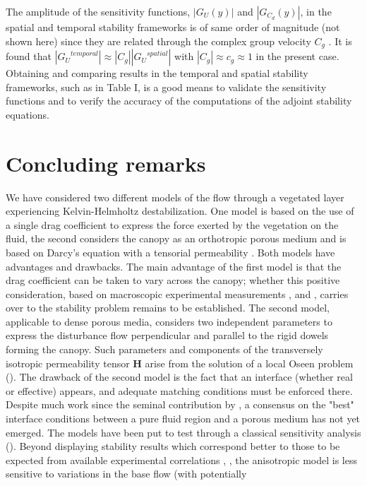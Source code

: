 The amplitude of the sensitivity functions, $|G_{U} ( y)|$ and $|G_{C_d} (y)|$, in the spatial and temporal
stability frameworks is of same order of magnitude (not shown here) since they are related through
 the complex group velocity $C_g$ . It is found that $|{G_U}^{temporal}| \approx |C_g ||{G_U}^{spatial}|$ with $|C_g | \approx c_g \approx 1$ in the
present case.
Obtaining and comparing results in the temporal and spatial stability frameworks, such as in
Table I, is a good means to validate the sensitivity functions and to verify the accuracy of the
computations of the adjoint stability equations.


\section{Concluding remarks}
We have considered two different models of the flow through a vegetated layer experiencing Kelvin-Helmholtz destabilization. One model is based on the use of a single drag coefficient to express the force exerted by the vegetation on the fluid, the second considers the canopy as an orthotropic porous medium and is based on Darcy’s equation with a tensorial permeability \citet{zampogna2016fluid}. 
Both models have advantages and drawbacks. The main advantage of the first model is that the
drag coefficient can be taken to vary across the canopy; whether this positive consideration, based
on macroscopic experimental measurements \citet{ghisalberti2002mixing}, \citet{ghisalberti2004limited} and \citet{ghisalberti2005mass},  carries over to the stability problem remains to be established. The second model, applicable to dense porous media, considers two independent parameters to express the disturbance flow perpendicular and parallel to the rigid dowels forming
the canopy. Such parameters and components of the transversely isotropic permeability tensor $\mathbf{H}$
arise from the solution of a local Oseen problem (\citet{zampogna2016fluid}). The drawback of the second model is the
fact that an interface (whether real or effective) appears, and adequate matching conditions must
be enforced there. Despite much work since the seminal contribution by \citet{beaver}, a
consensus on the "best" interface conditions between a pure fluid region and a porous medium has
not yet emerged.
The models have been put to test through a classical sensitivity analysis (\citet{bottaro2003effect}). Beyond displaying stability results which correspond better to those to be expected from available experimental correlations \citet{raupach1996coherent}, \citet{zampogna2016instability}, the anisotropic model is less sensitive to variations in the base flow (with potentially
